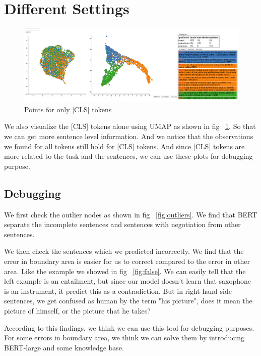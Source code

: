 \section{Different Settings}
\begin{figure}[b]

\includegraphics[width=.9\textwidth]{figs/fig6.png}

\caption{Points for only [CLS] tokens}
\label{fig:new1}

\end{figure}

We also visualize the [CLS] tokens alone using UMAP as shown in fig ~\ref{fig:new1}. So that we can get more sentence level information. And we notice that the observations we found for all tokens still hold for [CLS] tokens. And since [CLS] tokens are more related to the task and the sentences, we can use these plots for debugging purpose. 

\subsection{Debugging}

{}  
We first check the outlier nodes as shown in fig ~\ref{fig:outliers}. We find that BERT separate the incomplete sentences and sentences with negotiation from other sentences.

{}  
We then check the sentences which we predicted incorrectly. We find that the error in boundary area is easier for us to correct compared to the error in other area. Like the example we showed in fig ~\ref{fig:false}. We can easily tell that the left example is an entailment, but since our model doesn't learn that saxophone is an instrument, it predict this as a contradiction. But in right-hand side sentences, we get confused as human by the term "his picture", does it mean the picture of himself, or the picture that he takes?

According to this findings, we think we can use this tool for debugging purposes. For some errors in boundary area, we think we can solve them by introducing BERT-large and some knowledge base.


